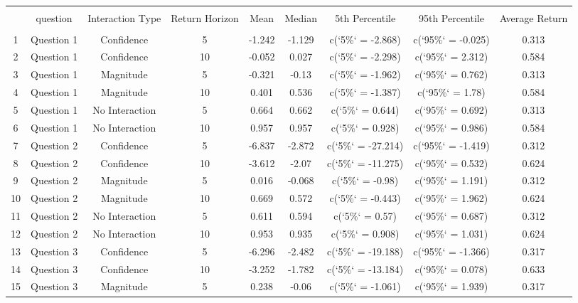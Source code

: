 
\begin{table}[!htbp] \centering 
  \caption{} 
  \label{} 
\begin{tabular}{@{\extracolsep{5pt}} ccccccccc} 
\\[-1.8ex]\hline 
\hline \\[-1.8ex] 
 & question & Interaction Type & Return Horizon & Mean & Median & 5th Percentile & 95th Percentile & Average Return \\ 
\hline \\[-1.8ex] 
1 & Question 1 & Confidence & 5 & -1.242 & -1.129 & c(`5\%` = -2.868) & c(`95\%` = -0.025) & 0.313 \\ 
2 & Question 1 & Confidence & 10 & -0.052 & 0.027 & c(`5\%` = -2.298) & c(`95\%` = 2.312) & 0.584 \\ 
3 & Question 1 & Magnitude & 5 & -0.321 & -0.13 & c(`5\%` = -1.962) & c(`95\%` = 0.762) & 0.313 \\ 
4 & Question 1 & Magnitude & 10 & 0.401 & 0.536 & c(`5\%` = -1.387) & c(`95\%` = 1.78) & 0.584 \\ 
5 & Question 1 & No Interaction & 5 & 0.664 & 0.662 & c(`5\%` = 0.644) & c(`95\%` = 0.692) & 0.313 \\ 
6 & Question 1 & No Interaction & 10 & 0.957 & 0.957 & c(`5\%` = 0.928) & c(`95\%` = 0.986) & 0.584 \\ 
7 & Question 2 & Confidence & 5 & -6.837 & -2.872 & c(`5\%` = -27.214) & c(`95\%` = -1.419) & 0.312 \\ 
8 & Question 2 & Confidence & 10 & -3.612 & -2.07 & c(`5\%` = -11.275) & c(`95\%` = 0.532) & 0.624 \\ 
9 & Question 2 & Magnitude & 5 & 0.016 & -0.068 & c(`5\%` = -0.98) & c(`95\%` = 1.191) & 0.312 \\ 
10 & Question 2 & Magnitude & 10 & 0.669 & 0.572 & c(`5\%` = -0.443) & c(`95\%` = 1.962) & 0.624 \\ 
11 & Question 2 & No Interaction & 5 & 0.611 & 0.594 & c(`5\%` = 0.57) & c(`95\%` = 0.687) & 0.312 \\ 
12 & Question 2 & No Interaction & 10 & 0.953 & 0.935 & c(`5\%` = 0.908) & c(`95\%` = 1.031) & 0.624 \\ 
13 & Question 3 & Confidence & 5 & -6.296 & -2.482 & c(`5\%` = -19.188) & c(`95\%` = -1.366) & 0.317 \\ 
14 & Question 3 & Confidence & 10 & -3.252 & -1.782 & c(`5\%` = -13.184) & c(`95\%` = 0.078) & 0.633 \\ 
15 & Question 3 & Magnitude & 5 & 0.238 & -0.06 & c(`5\%` = -1.061) & c(`95\%` = 1.939) & 0.317 \\ 

\end{tabular}
\end{table}
